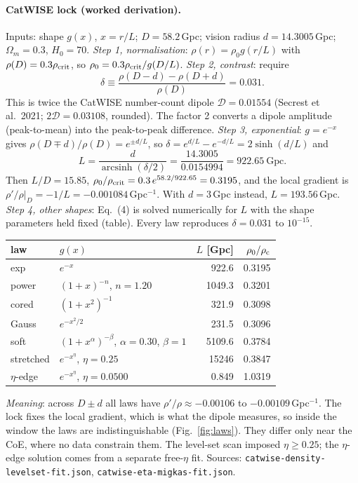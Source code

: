 \documentclass[10pt,twocolumn]{article}
\begin{document}
\paragraph{CatWISE lock (worked derivation).} Inputs: shape $g(x)$, $x=r/L$; $D=58.2$\,Gpc; vision radius $d=14.3005$\,Gpc; $\Omega_m=0.3$, $H_0=70$. \emph{Step 1, normalisation}: $\rho(r)=\rho_0g(r/L)$ with $\rho(D)=0.3\rho_{\rm crit}$, so $\rho_0=0.3\rho_{\rm crit}/g(D/L)$. \emph{Step 2, contrast}: require
\begin{equation}
\delta\equiv\frac{\rho(D-d)-\rho(D+d)}{\rho(D)}=0.031 .
\end{equation}
This is twice the CatWISE number-count dipole $\mathcal D=0.01554$ (Secrest et al.\ 2021; $2\mathcal D=0.03108$, rounded). The factor 2 converts a dipole amplitude (peak-to-mean) into the peak-to-peak difference. \emph{Step 3, exponential}: $g=e^{-x}$ gives $\rho(D\mp d)/\rho(D)=e^{\pm d/L}$, so $\delta=e^{d/L}-e^{-d/L}=2\sinh(d/L)$ and
\begin{equation}
L=\frac{d}{\operatorname{arcsinh}(\delta/2)}=\frac{14.3005}{0.0154994}=922.65\ \text{Gpc}.
\end{equation}
Then $L/D=15.85$, $\rho_0/\rho_{\rm crit}=0.3\,e^{58.2/922.65}=0.3195$, and the local gradient is $\rho'/\rho|_D=-1/L=-0.001084$\,Gpc$^{-1}$. With $d=3$\,Gpc instead, $L=193.56$\,Gpc. \emph{Step 4, other shapes}: Eq.~(4) is solved numerically for $L$ with the shape parameters held fixed (table). Every law reproduces $\delta=0.031$ to $10^{-15}$.
\begin{center}\small\begin{tabular}{@{}llrr@{}}
law & $g(x)$ & $L$ [Gpc] & $\rho_0/\rho_{\rm c}$\\\hline
exp & $e^{-x}$ & 922.6 & 0.3195\\
power & $(1+x)^{-n}$, $n{=}1.20$ & 1049.3 & 0.3201\\
cored & $(1+x^2)^{-1}$ & 321.9 & 0.3098\\
Gauss & $e^{-x^2/2}$ & 231.5 & 0.3096\\
soft & $(1+x^{\alpha})^{-\beta}$, $\alpha{=}0.30$, $\beta{=}1$ & 5109.6 & 0.3784\\
stretched & $e^{-x^{\eta}}$, $\eta{=}0.25$ & 15246 & 0.3847\\
$\eta$-edge & $e^{-x^{\eta}}$, $\eta{=}0.0500$ & 0.849 & 1.0319\\
\end{tabular}\end{center}
\emph{Meaning}: across $D\pm d$ all laws have $\rho'/\rho\approx-0.00106$ to $-0.00109$\,Gpc$^{-1}$. The lock fixes the local gradient, which is what the dipole measures, so inside the window the laws are indistinguishable (Fig.~\ref{fig:laws}). They differ only near the CoE, where no data constrain them. The level-set scan imposed $\eta\ge0.25$; the $\eta$-edge solution comes from a separate free-$\eta$ fit. Sources: \texttt{catwise-density-levelset-fit.json}, \texttt{catwise-eta-migkas-fit.json}.
\end{document}
